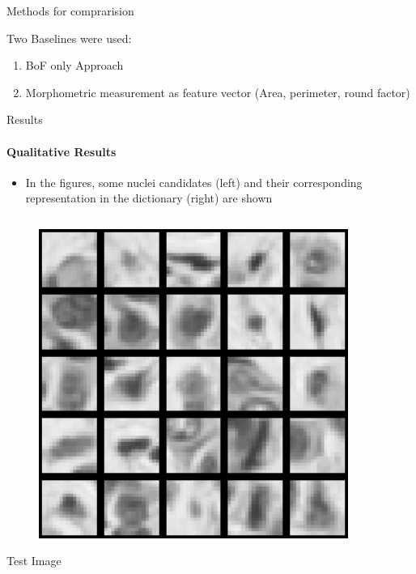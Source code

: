 \documentclass[usenames,dvipsnames]{beamer}
\begin{document}
\begin{frame}{Methods for comprarision}
\begin{block}{Two Baselines were used:}
\begin{enumerate}
\item BoF only Approach
\item Morphometric measurement as feature vector (Area, perimeter, round factor)
\end{enumerate}
\end{block}
\end{frame}

\begin{frame}{Results}
\framesubtitle{Qualitative Results}
\begin{itemize}
\item In the figures, some nuclei candidates (left) and their corresponding representation in the dictionary (right) are shown
\end{itemize}
\vspace{-0.8cm}
\begin{columns}[t, totalwidth=1\textwidth]
\begin{column}{0.5\textwidth}
\begin{center}
\begin{figure}
\includegraphics[width=0.9\textwidth]{imagenes/nuclei_test.png}
\end{figure}
\centering\small Test Image
\end{center}
\end{column}

\end{columns}
\end{frame}
\end{document}

